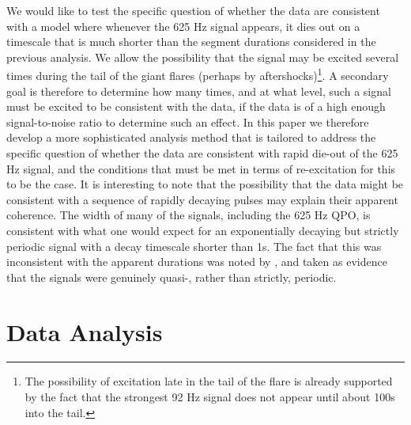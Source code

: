 \documentclass{emulateapj}
\begin{document}
We would like to test the specific question of whether the data are consistent with a model where whenever the 625 Hz signal appears, it dies out on a timescale that is much shorter than the segment durations considered in the previous analysis. We allow the possibility that the signal may be excited several times during the tail of the giant flares (perhaps by aftershocks)\footnote{The possibility of excitation late in the tail of the flare is already supported by the fact that the strongest 92 Hz signal does not appear until about 100s into the tail.}. A secondary goal is therefore to determine how many times, and at what level, such a signal must be excited to be consistent with the data, if the data is of a high enough signal-to-noise ratio to determine such an effect. In this paper we therefore develop a more sophisticated analysis method that is tailored to address the specific question of whether the data are consistent with rapid die-out of the 625 Hz signal, and the conditions that must be met in terms of re-excitation for this to be the case. It is interesting to note that the possibility that the data might be consistent with a sequence of rapidly decaying pulses may explain their apparent coherence. The width of many of the signals, including the 625 Hz QPO, is consistent with what one would expect for an exponentially decaying but strictly periodic signal with a decay timescale shorter than 1s. The fact that this was inconsistent with the apparent durations was noted by \citet{Watts11}, and taken as evidence that the signals were genuinely quasi-, rather than strictly, periodic.

\section{Data Analysis \footnotemark[2]} 
\label{sec:analysis}
\end{document}
